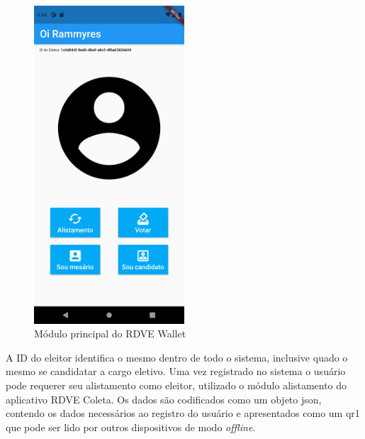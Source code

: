 \begin{figure}[!h]
	\centering
	\includegraphics[width=0.5\textwidth]{imagens/wallet1}
	\caption{Módulo principal do RDVE Wallet}
	\label{fig:wallet1}
\end{figure}
\clearpage


A ID do eleitor identifica o mesmo dentro de todo o sistema, inclusive quado o mesmo se candidatar a cargo eletivo. Uma vez registrado no sistema o usuário pode requerer seu alistamento como eleitor, utilizado o módulo alistamento do aplicativo RDVE Coleta. Os dados são codificados como um objeto \gls{json}, contendo os dados necessários ao registro do usuário e apresentados como um \gls{qr1} que pode ser lido por outros dispositivos de modo \textit{offline}. 

